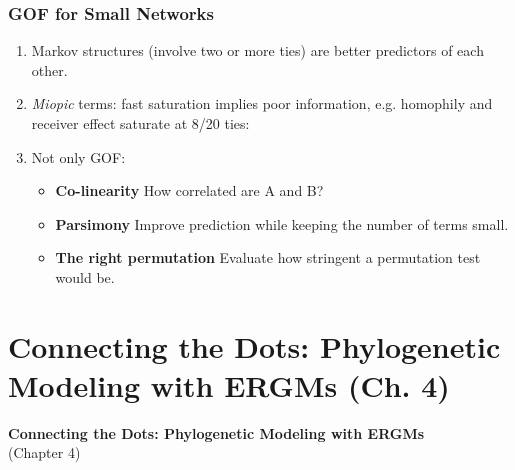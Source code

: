 \documentclass[aspectratio=169, 9pt]{beamer}
\begin{document}
\begin{frame}[c]
\frametitle{GOF for Small Networks}


\begin{enumerate}[<+->]
	\item Markov structures (involve two or more ties) are better predictors of each other.
	\item \textit{Miopic} terms: fast saturation implies poor information, e.g. homophily and receiver effect saturate at 8/20 ties:
	\begin{figure}
	\centering
	{\footnotesize{}
	
	}
	\end{figure}
	\vspace{.5cm}
	\item Not only GOF:
	\begin{itemize}
		\item \textbf{Co-linearity} How correlated are A and B?
		\item \textbf{Parsimony} Improve prediction while keeping the number of terms small.
		\item \textbf{The right permutation} Evaluate how stringent a permutation test would be.
	\end{itemize}
\end{enumerate}



\end{frame}



\section{Connecting the Dots: Phylogenetic Modeling with ERGMs (Ch. 4)}

\begin{frame}[t]
	\textcolor{uscgold}{
		\Large {\bf Connecting the Dots: Phylogenetic Modeling with ERGMs} \\
		(\small Chapter 4\Large)
	}
\end{frame}
\end{document}
